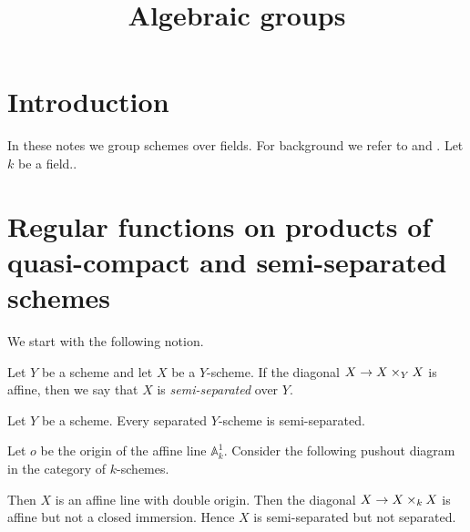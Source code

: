 



\title{Algebraic groups}
\date{}
\maketitle

\section{Introduction}
\noindent
In these notes we group schemes over fields. For background we refer to \cite{kfunctors} and \cite{Monoid_k_functors}. Let $k$ be a field..

\section{Regular functions on products of quasi-compact and semi-separated schemes}
\noindent
We start with the following notion.

\begin{definition}
Let $Y$ be a scheme and let $X$ be a $Y$-scheme. If the diagonal $X\rightarrow X\times_Y X$ is affine, then we say that $X$ is \textit{semi-separated} over $Y$.
\end{definition}

\begin{remark}\label{remark:separated_is_semi-separated}
Let $Y$ be a scheme. Every separated $Y$-scheme is semi-separated.
\end{remark}

\begin{example}
Let $o$ be the origin of the affine line $\mathbb{A}^1_k$. Consider the following pushout diagram in the category of $k$-schemes.
\begin{center}
\end{center}
Then $X$ is an affine line with double origin. Then the diagonal $X\rightarrow X\times_k X$ is affine but not a closed immersion. Hence $X$ is semi-separated but not separated.
\end{example}

